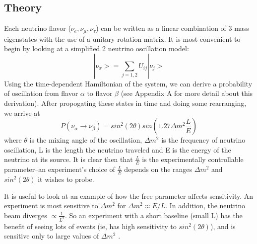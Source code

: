 \documentclass[12pt]{article}
\begin{document}
\subsection{Theory}
\par Each neutrino flavor ($\nu_e, \nu_\mu, \nu_\tau$) can be written as a linear combination of 3 mass eigenstates with the use of a unitary rotation matrix. It is most convenient to begin by looking at a simplified 2 neutrino oscillation model:
\begin{equation} \label{eq:eig}
|\nu_x> = \sum_{j=1,2} U_{ij} |\nu_j>  
\end{equation}
Using the time-dependent Hamiltonian of the system, we can derive a probability of oscillation from flavor $\alpha$ to flavor $\beta$ (see Appendix A for more detail about this derivation).  After propogating these states in time and doing some rearranging, we arrive at 
\begin{equation} \label{eq:prob}
P(\nu_\alpha \rightarrow \nu_\beta) = sin^2(2\theta)sin(1.27\Delta m^2  \frac{L}{E})
\end{equation}
where $\theta$ is the mixing angle of the oscillation, $\Delta m^2$ is the frequency of neutrino oscillation, L is the length the neutrino traveled and E is the energy of the neutrino at its source.  It is clear then that $\frac{L}{E}$ is the experimentally controllable parameter--an experiment's choice of $\frac{L}{E}$ depends on the ranges $\Delta m^2$ and $sin^2(2\theta)$ it wishes to probe. 
\par It is useful to look at an example of how the free parameter affects sensitivity.  An experiment is most sensitive to $\Delta m^2$ for $\Delta m^2 \approx E/L$.  In addition, the neutrino beam diverges $\propto \frac{1}{L^2}$.  So an experiment with a short baseline (small L) has the benefit of seeing lots of events (ie, has high sensitivity to $sin^2(2\theta)$), and is sensitive only to large values of $\Delta m^2$ \cite{warwick}. 
\end{document}
